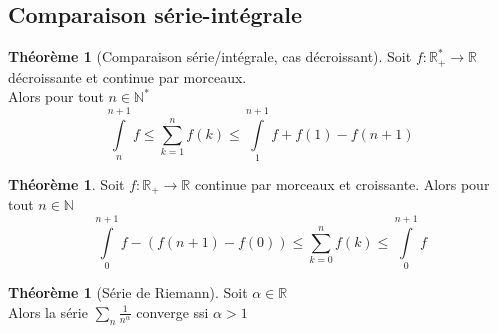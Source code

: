 \documentclass[10pt,a4paper]{article}
\theoremstyle{definition}
\newtheorem{theorem}[proposition]{Théorème}
\begin{document}
\subsection{Comparaison série-intégrale}
\begin{theorem}[Comparaison série/intégrale, cas décroissant]
Soit $f: \mathbb{R}_+^* \to \mathbb{R}$ décroissante et continue par morceaux. \\
Alors pour tout $n \in \mathbb{N}^*$
\[\int\limits_n^{n + 1}f \leq \sum_{k = 1}^n f(k) \leq \int\limits_1^{n + 1}f + f(1) - f(n+1)\]
\end{theorem}
\begin{theorem}
Soit $f: \mathbb{R}_+ \to \mathbb{R}$ continue par morceaux et croissante. Alors pour tout $n \in \mathbb{N}$
\[\int\limits_{0}^{n + 1} f - ( f(n + 1) - f(0)) \leq \sum_{k = 0}^n f(k) \leq \int\limits_{0}^{n + 1} f\]
\end{theorem}
\begin{theorem}[Série de Riemann]
Soit $\alpha \in \mathbb{R}$ \\
Alors la série $\sum_n \frac{1}{n^\alpha}$ converge ssi $\alpha > 1$
\end{theorem}
\end{document}
